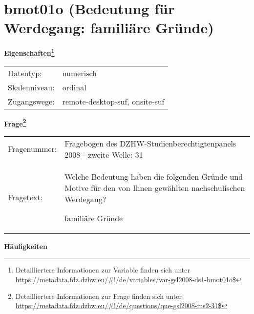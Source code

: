 
    \setcounter{footnote}{0}

    \vspace*{-1.8cm}
	\section{bmot01o (Bedeutung für Werdegang: familiäre Gründe)}
	\label{section:bmot01o}



    \vspace*{0.5cm}
    \noindent\textbf{Eigenschaften\footnote{Detailliertere Informationen zur Variable finden sich unter
		\url{https://metadata.fdz.dzhw.eu/\#!/de/variables/var-gsl2008-ds1-bmot01o$}}}\\
	\begin{tabularx}{\hsize}{@{}lX}
	Datentyp: & numerisch \\
	Skalenniveau: & ordinal \\
	Zugangswege: &
	  remote-desktop-suf, 
	  onsite-suf
 \\
    \end{tabularx}



				\vspace*{0.5cm}
                \noindent\textbf{Frage\footnote{Detailliertere Informationen zur Frage finden sich unter
		              \url{https://metadata.fdz.dzhw.eu/\#!/de/questions/que-gsl2008-ins2-31$}}}\\
				\begin{tabularx}{\hsize}{@{}lX}
					Fragenummer: &
					  Fragebogen des DZHW-Studienberechtigtenpanels 2008 - zweite Welle:
					  31
 \\
					Fragetext: & Welche Bedeutung haben die folgenden Gründe und Motive für den von Ihnen gewählten nachschulischen Werdegang?\par  familiäre Gründe \\
				\end{tabularx}





        		\vspace*{0.5cm}
                \noindent\textbf{Häufigkeiten}

